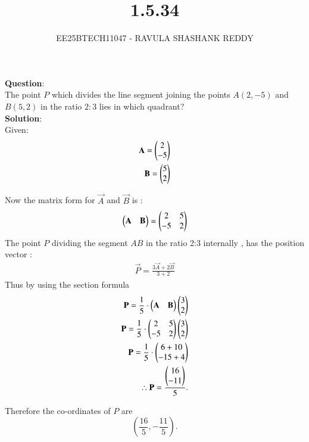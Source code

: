 \documentclass[journal]{article}
\begin{document}
	
	
	\vspace{3cm}
	
\title{1.5.34}
\author{EE25BTECH11047 - RAVULA SHASHANK REDDY}
\maketitle
\hrulefill
\bigskip 

\renewcommand{\thetable}{\theenumi}
\setlength{\intextsep}{10pt}

\textbf{Question}:\\

The point \(P\) which divides the line segment joining the points \(A(2,-5)\) and \(B(5,2)\) in the ratio \(2:3\) lies in which quadrant?\\

\textbf{Solution}:\\

  Given:
\begin{align}
\mathbf{A} = \begin{pmatrix}2 \\ -5\end{pmatrix} \\ \mathbf{B} = \begin{pmatrix}5 \\ 2\end{pmatrix}
\end{align}

Now the matrix form for $\vec{A}$ and $\vec{B}$ is :
\begin{align}
    \begin{pmatrix}\mathbf{A} & \mathbf{B}\end{pmatrix} = \begin{pmatrix}2 & 5 \\ -5 & 2\end{pmatrix}
\end{align}
The point \(P\) dividing the segment \(AB\) in the ratio 2:3 internally , has the position vector :
\begin{align}
\vec{P} = \frac{ 3\vec{A} +2\vec{B} }{3+2} 
\end{align}
Thus by using the section formula \\
\begin{align} 
\mathbf{P}= \frac{1}{5} \cdot \begin{pmatrix}\mathbf{A} & \mathbf{B}\end{pmatrix}\begin{pmatrix}3 \\ 2\end{pmatrix}\\
\mathbf{P}= \frac{1}{5} \cdot \begin{pmatrix}2 & 5 \\ -5 & 2\end{pmatrix}\begin{pmatrix}3 \\ 2\end{pmatrix}\\
\mathbf{P}= \frac{1}{5} \cdot \begin{pmatrix}6 + 10\\ -15 + 4\end{pmatrix}\\
\therefore \mathbf{P}= \frac{\begin{pmatrix}16 \\ -11\end{pmatrix}}{5}.
\end{align}

Therefore the co-ordinates of \(P\) are \[
\left(\dfrac{16}{5}, -\dfrac{11}{5}\right).
\]
\end{document}
